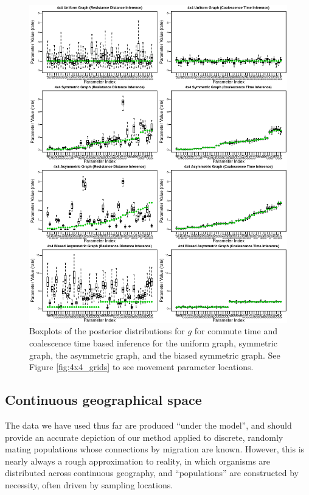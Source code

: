 \documentclass{article}
\begin{document}
\begin{figure}
\centering
     \includegraphics[scale=1]{figs/4x4boxplots_paper}
    \caption{Boxplots of the posterior distributions for $g$ for commute time and coalescence time
    based inference for the uniform graph, symmetric graph, 
    the asymmetric graph, and the biased symmetric graph.
    See Figure \ref{fig:4x4_grids} to see movement parameter locations.}
    \label{fig:4x4box}
\end{figure}


\subsection*{Continuous geographical space}

The data we have used thus far are produced ``under the model'',
and should provide an accurate depiction of our method applied to discrete, randomly mating populations
whose connections by migration are known.
However, this is nearly always a rough approximation to reality,
in which organisms are distributed across continuous geography,
and ``populations'' are constructed by necessity, often driven by sampling locations.
\end{document}
